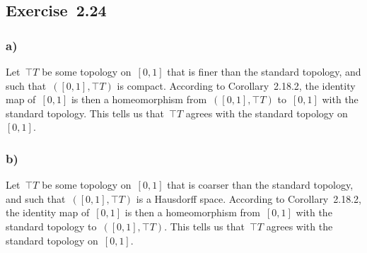 \subsection{Exercise~2.24}



\subsubsection{a)}

Let~$\top{T}$ be some topology on~$[0, 1]$ that is finer than the standard topology, and such that~$([0, 1], \top{T})$ is compact.
According to Corollary~2.18.2, the identity map of~$[0, 1]$ is then a homeomorphism from~$([0, 1], \top{T})$ to~$[0, 1]$ with the standard topology.
This tells us that~$\top{T}$ agrees with the standard topology on~$[0, 1]$.



\subsubsection{b)}

Let~$\top{T}$ be some topology on~$[0, 1]$ that is coarser than the standard topology, and such that~$([0, 1], \top{T})$ is a Hausdorff space.
According to Corollary~2.18.2, the identity map of~$[0, 1]$ is then a homeomorphism from~$[0, 1]$ with the standard topology to~$([0, 1], \top{T})$.
This tells us that~$\top{T}$ agrees with the standard topology on~$[0, 1]$.
